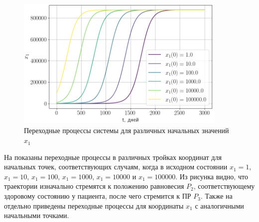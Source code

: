 \documentclass[14pt,a4paper]{extarticle}
\begin{document}
\begin{example}
		\begin{figure}[h]
			\centering
			\includegraphics[width=0.90\textwidth]{media/Figure_12.png}
			\caption{Переходные процессы системы для различных начальных значений~$x_1$}
			\label{fig:x1_transitions}
		\end{figure}
		
		На  показаны переходные процессы в различных тройках координат для начальных точек, соответствующих случаям, когда в исходном состоянии $x_1=1$, $x_1=10$, $x_1=100$, $x_1=1000$, $x_1=10000$ и $x_1=100000$. Из рисунка видно, что траектории изначально стремятся к положению равновесия $P_2$, соответствующему здоровому состоянию у пациента, после чего стремится к ПР $P_3$. Также на  отдельно приведены переходные процессы для координаты $x_1$ с аналогичными начальными точками.


\end{example}
\end{document}
